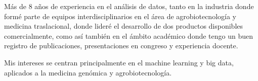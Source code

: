 \documentclass[10pt,a4paper,ragged2e]{altacv}
\begin{document}

\begin{fullwidth}
\makecvheader
\end{fullwidth}



Más de 8 años de experiencia en el análisis de datos, tanto en la industria donde formé parte de equipos interdisciplinarios en el área de agrobiotecnología y medicina traslacional, donde lideré el desarrollo de dos productos disponibles comercialmente, como así también en el ámbito académico donde tengo un buen registro de publicaciones, presentaciones en congreso y experiencia docente. 

Mis intereses se centran principalmente en el machine learning y big data, aplicados a la medicina genómica y agrobiotecnología.

\medskip


\end{document}

